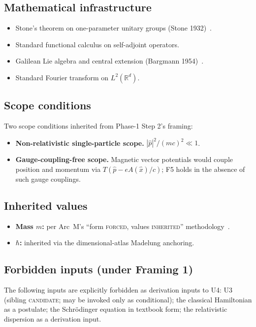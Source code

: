 \documentclass[11pt,a4paper]{article}
\begin{document}
\subsection{Mathematical infrastructure}

\begin{itemize}
  \item Stone's theorem on one-parameter unitary groups (Stone 1932)~\cite{stone}.
  \item Standard functional calculus on self-adjoint operators.
  \item Galilean Lie algebra and central extension (Bargmann 1954)~\cite{bargmann}.
  \item Standard Fourier transform on $L^2(\mathbb{R}^d)$.
\end{itemize}

\subsection{Scope conditions}

Two scope conditions inherited from Phase-1 Step 2's framing:
\begin{itemize}
  \item \textbf{Non-relativistic single-particle scope.} $|\hat{p}|^2 / (mc)^2 \ll 1$.
  \item \textbf{Gauge-coupling-free scope.} Magnetic vector potentials would couple position and momentum via $T(\hat{p} - eA(\hat{x})/c)$; F5 holds in the absence of such gauge couplings.
\end{itemize}

\subsection{Inherited values}

\begin{itemize}
  \item \textbf{Mass $m$:} per Arc~M's ``form \textsc{forced}, values \textsc{inherited}'' methodology~\cite{arcm}.
  \item \textbf{$\hbar$:} inherited via the dimensional-atlas Madelung anchoring.
\end{itemize}

\subsection{Forbidden inputs (under Framing 1)}

The following inputs are explicitly forbidden as derivation inputs to U4: U3 (sibling \textsc{candidate}; may be invoked only as conditional); the classical Hamiltonian as a postulate; the Schr\"odinger equation in textbook form; the relativistic dispersion as a derivation input.
\end{document}
